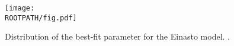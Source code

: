 \begin{figure}
	\centering%
	\texttt{[image: \\ROOTPATH/fig.pdf]}
	\caption{Distribution of the best-fit parameter for the Einasto model. .}%
	\label{fig:parameter-distribution:einasto}%
\end{figure}